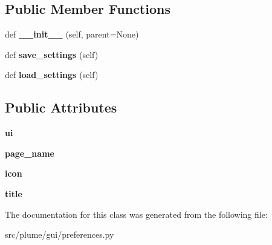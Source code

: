 \subsection*{Public Member Functions}
\begin{DoxyCompactItemize}
\item 
def {\bfseries \+\_\+\+\_\+init\+\_\+\+\_\+} (self, parent=None)\hypertarget{classplume-creator_1_1src_1_1plume_1_1gui_1_1preferences_1_1_miscellanous_preferences_a1d18bfeeadad302cc07716bb65cce28f}{}\label{classplume-creator_1_1src_1_1plume_1_1gui_1_1preferences_1_1_miscellanous_preferences_a1d18bfeeadad302cc07716bb65cce28f}

\item 
def {\bfseries save\+\_\+settings} (self)\hypertarget{classplume-creator_1_1src_1_1plume_1_1gui_1_1preferences_1_1_miscellanous_preferences_a763ad0a21739caeb2c88493cbab0aa7c}{}\label{classplume-creator_1_1src_1_1plume_1_1gui_1_1preferences_1_1_miscellanous_preferences_a763ad0a21739caeb2c88493cbab0aa7c}

\item 
def {\bfseries load\+\_\+settings} (self)\hypertarget{classplume-creator_1_1src_1_1plume_1_1gui_1_1preferences_1_1_miscellanous_preferences_a20c491975c96597ba1acdc7b456687d1}{}\label{classplume-creator_1_1src_1_1plume_1_1gui_1_1preferences_1_1_miscellanous_preferences_a20c491975c96597ba1acdc7b456687d1}

\end{DoxyCompactItemize}
\subsection*{Public Attributes}
\begin{DoxyCompactItemize}
\item 
{\bfseries ui}\hypertarget{classplume-creator_1_1src_1_1plume_1_1gui_1_1preferences_1_1_miscellanous_preferences_ad1580e9322408654812ae45b599eea29}{}\label{classplume-creator_1_1src_1_1plume_1_1gui_1_1preferences_1_1_miscellanous_preferences_ad1580e9322408654812ae45b599eea29}

\item 
{\bfseries page\+\_\+name}\hypertarget{classplume-creator_1_1src_1_1plume_1_1gui_1_1preferences_1_1_miscellanous_preferences_a15356f4f699b79813e16c557d0fe261a}{}\label{classplume-creator_1_1src_1_1plume_1_1gui_1_1preferences_1_1_miscellanous_preferences_a15356f4f699b79813e16c557d0fe261a}

\item 
{\bfseries icon}\hypertarget{classplume-creator_1_1src_1_1plume_1_1gui_1_1preferences_1_1_miscellanous_preferences_a749313f584f89f8823d1da6757a82791}{}\label{classplume-creator_1_1src_1_1plume_1_1gui_1_1preferences_1_1_miscellanous_preferences_a749313f584f89f8823d1da6757a82791}

\item 
{\bfseries title}\hypertarget{classplume-creator_1_1src_1_1plume_1_1gui_1_1preferences_1_1_miscellanous_preferences_a4022e49e2592da90cd8c19cb25c9a6f3}{}\label{classplume-creator_1_1src_1_1plume_1_1gui_1_1preferences_1_1_miscellanous_preferences_a4022e49e2592da90cd8c19cb25c9a6f3}

\end{DoxyCompactItemize}


The documentation for this class was generated from the following file\+:\begin{DoxyCompactItemize}
\item 
src/plume/gui/preferences.\+py\end{DoxyCompactItemize}
